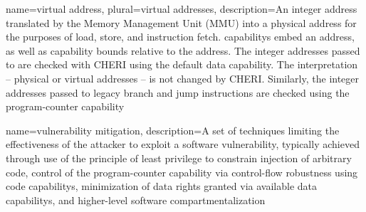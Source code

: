 {
  name=virtual address,
  plural=virtual addresses,
  description={An integer \gls{address} translated by the Memory Management
    Unit (MMU) into a \gls{physical address} for the purposes of load, store,
    and instruction fetch.
    \Glspl{capability} embed an address, as well as \gls{capability bounds}
    relative to the address.
    The integer addresses passed to  are checked with CHERI using the
    \gls{default data capability}. The interpretation -- physical or virtual
    addresses -- is not changed by CHERI.
    Similarly, the integer addresses passed to legacy branch and jump
    instructions are checked using the \gls{program-counter capability}}
}

{
  name=vulnerability mitigation,
  description={A set of techniques limiting the effectiveness of the attacker
    to exploit a software vulnerability, typically achieved through use of
    the \gls{principle of least privilege} to constrain injection of
    arbitrary code, control of the \gls{program-counter capability} via
    \gls{control-flow robustness} using \glspl{code capability}, minimization of
    data rights granted via available \glspl{data capability}, and higher-level
    \gls{software compartmentalization}}
}
